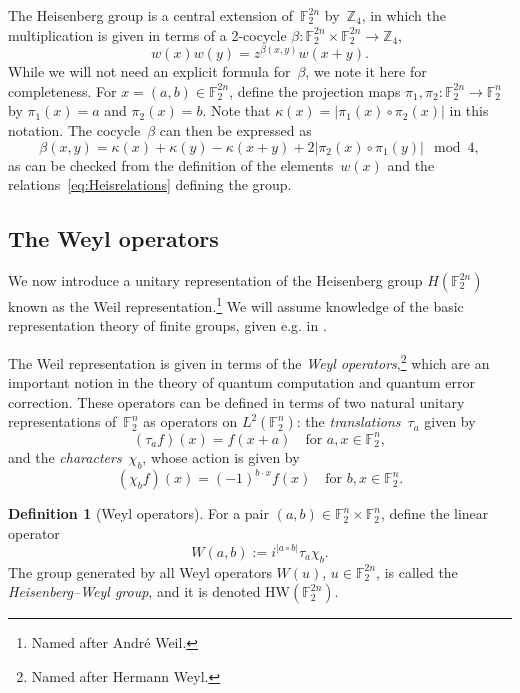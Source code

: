 \documentclass[11pt]{amsart}
\newcommand{\Z}{\mathbb{Z}} %
\newcommand{\F}{\mathbb{F}} %
\newcommand{\HW}{\mathrm{HW}}
\theoremstyle{plain}
\theoremstyle{definition}
\newtheorem{definition}[theorem]{Definition}
\theoremstyle{remark}
\begin{document}
The Heisenberg group is a central extension of~$\F_2^{2n}$ by~$\Z_4$, in which the multiplication is given in terms of a 2-cocycle $\beta: \F_2^{2n} \times\F_2^{2n} \to \Z_4$,
\begin{equation} \label{eq:multiplication}
    w(x)w(y) = z^{\beta(x, y)} w(x+y).
\end{equation}
While we will not need an explicit formula for~$\beta$, we note it here for completeness.
For $x = (a, b) \in \F_2^{2n}$, define the projection maps $\pi_1, \pi_2: \F_2^{2n} \to \F_2^n$ by $\pi_1(x)=a$ and $\pi_2(x)=b$.
Note that $\kappa(x) = |\pi_1(x) \circ \pi_2(x)|$ in this notation.
The cocycle~$\beta$ can then be expressed as
\begin{equation} \label{eq:beta}
    \beta(x, y) = \kappa(x) + \kappa(y) - \kappa(x+y) + 2 \big|\pi_2(x)\circ \pi_1(y)\big| \mod{4},
\end{equation}
as can be checked from the definition of the elements~$w(x)$ and the relations~\eqref{eq:Heisrelations} defining the group.


\subsection{The Weyl operators}
We now introduce a unitary representation of the Heisenberg group $H(\F_2^{2n})$ known as the Weil representation.\footnote{Named after Andr\'{e} Weil.}
We will assume knowledge of the basic representation theory of finite groups, given e.g. in \cite[Chapter~10]{CSTbook2018}.

The Weil representation is given in terms of the \emph{Weyl operators},\footnote{Named after Hermann Weyl.}
which are an important notion in the theory of quantum computation and quantum error correction.
These operators can be defined in terms of two natural unitary representations of~$\F_2^n$ as operators on $L^2(\F_2^n)$:
the \emph{translations}~$\tau_a$ given by
$$(\tau_a f)(x) = f(x+a) \quad \text{for $a, x\in \F_2^n$},$$
and the \emph{characters}~$\chi_b$, whose action is given by
$$(\chi_b f)(x) = (-1)^{b\cdot x} f(x) \quad \text{for $b, x\in \F_2^n$.}$$

\begin{definition}[Weyl operators]\label{def:Weyl}
    For a pair $(a,b)\in \F_2^n\times\F_2^n$, define the linear operator
    $$W(a,b) := i^{|a\circ b|} \tau_a \chi_b.$$
    The group generated by all Weyl operators $W(u)$, $u\in \F_2^{2n}$, is called the \emph{Heisenberg--Weyl group}, and it is denoted $\HW(\F_2^{2n})$.
\end{definition}
\end{document}
